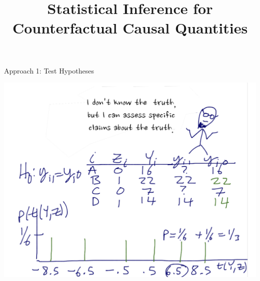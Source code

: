 

%

%





\title[Recap/Overview]{Statistical Inference for Counterfactual Causal Quantities}







\begin{frame}{Approach 1: Test Hypotheses}


  \smallskip
  \centering
  \includegraphics[width=.9\textwidth]{images/cartoonFisher.pdf}


\end{frame}


